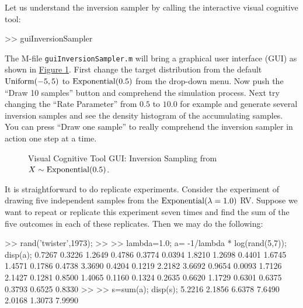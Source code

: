 \begin{labwork}\label{LW:guiInversionSamplerExponential}
Let us understand the inversion sampler by calling the interactive visual cognitive tool:
\begin{VrbM}
>> guiInversionSampler
\end{VrbM}
The M-file {\tt guiInversionSampler.m} will bring a graphical user interface (GUI) as shown in \hyperref[F:guiInversionSamplerExponential]{Figure \ref*{F:guiInversionSamplerExponential}}.  First change the target distribution from the default $\mbox{{\rm Uniform}}(-5,5)$ to $\mbox{{\rm Exponential}}(0.5)$ from the drop-down menu.  Now push the ``Draw 10 samples'' button and comprehend the simulation process.  Next try changing the ``Rate Parameter'' from $0.5$ to $10.0$ for example  and generate several inversion samples and see the density histogram of the accumulating samples.  You can press ``Draw one sample'' to really comprehend the inversion sampler in action one step at a time.
\end{labwork}

\begin{figure}[htpb]
\caption{Visual Cognitive Tool GUI: Inversion Sampling from $X \sim \mbox{{\rm Exponential}}(0.5)$.\label{F:guiInversionSamplerExponential}}
\centering   {}
\end{figure}
It is straightforward to do replicate experiments.  Consider the experiment of drawing five  independent samples from the $\mbox{{\rm Exponential}}(\lambda=1.0)$ RV.  Suppose we want to repeat or replicate this experiment seven times and find the sum of the five outcomes in each of these replicates.  Then we may do the following:

\begin{VrbM}
>> rand('twister',1973); %
>> %
>> lambda=1.0; a= -1/lambda * log(rand(5,7)); disp(a);
    0.7267    0.3226    1.2649    0.4786    0.3774    0.0394    1.8210
    1.2698    0.4401    1.6745    1.4571    0.1786    0.4738    3.3690
    0.4204    0.1219    2.2182    3.6692    0.9654    0.0093    1.7126
    2.1427    0.1281    0.8500    1.4065    0.1160    0.1324    0.2635
    0.6620    1.1729    0.6301    0.6375    0.3793    0.6525    0.8330
>> %
>> s=sum(a); disp(s);
    5.2216    2.1856    6.6378    7.6490    2.0168    1.3073    7.9990
\end{VrbM}

